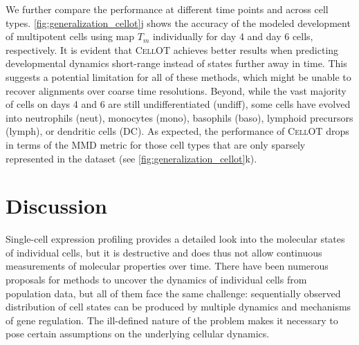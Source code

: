 We further compare the performance at different time points and across cell types.
\cref{fig:generalization_cellot}j shows the accuracy of the modeled development of multipotent cells using map $T_m$ individually for day 4 and day 6 cells, respectively. It is evident that \textsc{CellOT} achieves better results when predicting developmental dynamics short-range instead of states further away in time.
This suggests a potential limitation for all of these methods, which might be unable to recover alignments over coarse time resolutions.
Beyond, while the vast majority of cells on days 4 and 6 are still undifferentiated (undiff), some cells have evolved into neutrophils (neut), monocytes (mono), basophils (baso), lymphoid precursors (lymph), or dendritic cells (DC).
As expected, the performance of \textsc{CellOT} drops in terms of the \acrshort{MMD} metric for those cell types that are only sparsely represented in the dataset (see \cref{fig:generalization_cellot}k).




\section{Discussion}


Single-cell expression profiling provides a detailed look into the molecular states of individual cells, but it is destructive and does thus not allow continuous measurements of molecular properties over time. There have been numerous proposals for methods to uncover the dynamics of individual cells from population data, but all of them face the same challenge: sequentially observed distribution of cell states can be produced by multiple dynamics and mechanisms of gene regulation. The ill-defined nature of the problem makes it necessary to pose certain assumptions on the underlying cellular dynamics.

